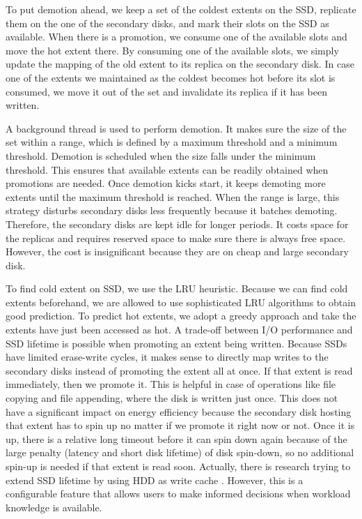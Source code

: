 To put demotion ahead, we keep a set of the coldest extents on the
SSD, replicate them on the one of the secondary disks, and mark their
slots on the SSD as available.  When there is a promotion, we
consume one of the available slots and move the hot extent there.  By
consuming one of the available slots, we simply update the mapping of
the old extent to its replica on the secondary disk. In case one of
the extents we maintained as the coldest becomes hot before its slot
is consumed, we move it out of the set and invalidate its replica if
it has been written.

A background thread is used to perform demotion. It makes sure the
size of the set within a range, which is defined by a maximum
threshold and a minimum threshold. Demotion is scheduled when the size
falls under the minimum threshold. This ensures that available extents
can be readily obtained when promotions are needed. Once demotion
kicks start, it keeps demoting more extents until the maximum threshold
is reached. When the range is large, this strategy disturbs secondary
disks less frequently because it batches demoting. Therefore, the
secondary disks are kept idle for longer periods.  It costs space for
the replicas and requires reserved space to make sure there is always
free space. However, the cost is insignificant because they are on
cheap and large secondary disk. 

To find cold extent on SSD, we use the LRU heuristic. Because we can
find cold extents beforehand, we are allowed to use sophisticated LRU
algorithms to obtain good prediction. To predict hot extents, we adopt
a greedy approach and take the extents have just been accessed as hot.
A trade-off between I/O performance and SSD lifetime is possible when
promoting an extent being written. Because SSDs have limited
erase-write cycles, it makes sense to directly map writes to the
secondary disks instead of promoting the extent all at once. If that
extent is read immediately, then we promote it. This is helpful in
case of operations like file copying and file appending, where the
disk is written just once. This does not have a significant impact on
energy efficiency because the secondary disk hosting that extent has
to spin up no matter if we promote it right now or not.  Once it is
up, there is a relative long timeout before it can spin down again
because of the large penalty (latency and short disk lifetime) of disk
spin-down, so no additional spin-up is needed if that extent is read
soon.  Actually, there is research trying to extend SSD lifetime by
using HDD as write cache \cite{hddcache}.  However, this is a
configurable feature that allows users to make informed decisions when
workload knowledge is available. 

